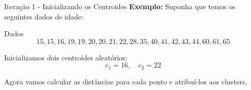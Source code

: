 \documentclass{beamer}
\begin{document}







\begin{frame}{Iteração 1 - Inicializando os Centroides}
    \textbf{Exemplo:} Suponha que temos os seguintes dados de idade:

    \begin{block}{Dados}
    \[
    15, 15, 16, 19, 19, 20, 20, 21, 22, 28, 35, 40, 41, 42, 43, 44, 60, 61, 65
    \]
    \end{block}

    Inicializamos dois centroides aleatórios:
    \[
    c_1 = 16, \quad c_2 = 22
    \]

    Agora vamos calcular as distâncias para cada ponto e atribuí-los aos clusters.
\end{frame}
\end{document}
